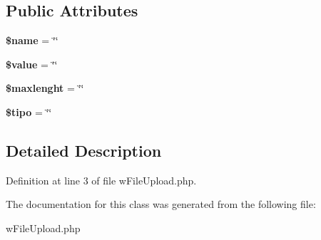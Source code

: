 \subsection*{Public Attributes}
\begin{DoxyCompactItemize}
\item 
\hypertarget{classwFileUpload_a5d338205c03c0f0eae5904a34a6307c9}{
{\bfseries \$name} = \char`\"{}\char`\"{}}
\label{classwFileUpload_a5d338205c03c0f0eae5904a34a6307c9}

\item 
\hypertarget{classwFileUpload_a961f77760208dc6194b31ae721017a95}{
{\bfseries \$value} = \char`\"{}\char`\"{}}
\label{classwFileUpload_a961f77760208dc6194b31ae721017a95}

\item 
\hypertarget{classwFileUpload_ad6ac17f433f473fa4f0c800830ded303}{
{\bfseries \$maxlenght} = \char`\"{}\char`\"{}}
\label{classwFileUpload_ad6ac17f433f473fa4f0c800830ded303}

\item 
\hypertarget{classwFileUpload_a6983bb9cf787dc6beb62faba6661ad48}{
{\bfseries \$tipo} = \char`\"{}\char`\"{}}
\label{classwFileUpload_a6983bb9cf787dc6beb62faba6661ad48}

\end{DoxyCompactItemize}


\subsection{Detailed Description}


Definition at line 3 of file wFileUpload.php.



The documentation for this class was generated from the following file:\begin{DoxyCompactItemize}
\item 
wFileUpload.php\end{DoxyCompactItemize}
